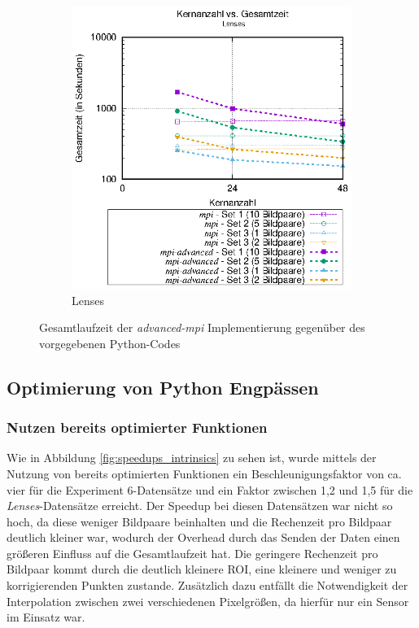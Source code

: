 \begin{center}
\begin{figure}[htbp]
\begin{subfigure}[b]{0.45\textwidth}
			\includegraphics[width=\textwidth]{pdf/mpi_advanced_times_lenses}
			\caption{Lenses}
			\label{fig:mpi_advanced_times_lenses}
		\end{subfigure}
		\caption{Gesamtlaufzeit der \textit{advanced-mpi} Implementierung gegenüber des vorgegebenen Python-Codes}
		\label{fig:mpi_advanced_times}
	\end{figure}
\end{center}

\subsection{Optimierung von Python Engpässen}

\subsubsection{Nutzen bereits optimierter Funktionen}

Wie in Abbildung \ref{fig:speedups_intrinsics} zu sehen ist, wurde mittels der Nutzung von bereits optimierten Funktionen ein Beschleunigungsfaktor von ca. vier für die Experiment 6-Datensätze und ein Faktor zwischen 1,2 und 1,5 für die \textit{Lenses}-Datensätze erreicht. Der Speedup bei diesen Datensätzen war nicht so hoch, da diese weniger Bildpaare beinhalten und die Rechenzeit pro Bildpaar deutlich kleiner war, wodurch der Overhead durch das Senden der Daten einen größeren Einfluss auf die Gesamtlaufzeit hat. Die geringere Rechenzeit pro Bildpaar kommt durch die deutlich kleinere \gls{ROI}, eine kleinere  und weniger zu korrigierenden Punkten zustande. Zusätzlich dazu entfällt die Notwendigkeit der Interpolation zwischen zwei verschiedenen Pixelgrößen, da hierfür nur ein Sensor im Einsatz war.

